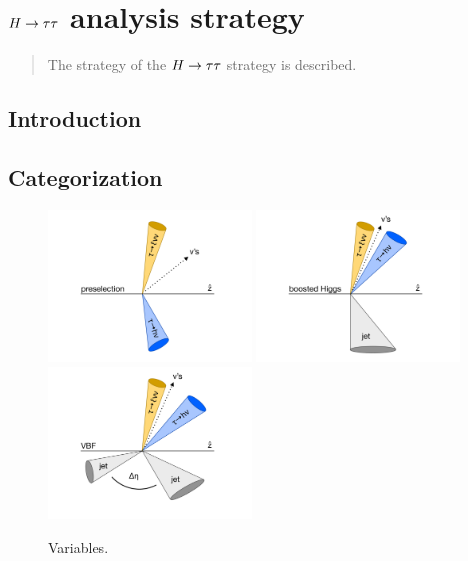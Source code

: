 \chapter[strategy][strategy]{$H\rightarrow\tau\tau$ analysis strategy}
\label{chap:strategy}

\begin{quote}
The strategy of the $H\rightarrow\tau\tau$ strategy is described.
\end{quote}

\section{Introduction}
\label{sec:strategy-introduction}

\section{Categorization}
\label{sec:strategy-categorization}

\begin{figure}[tp]
  \centering
  \includegraphics[width=0.48\textwidth]{figures/category-cartoons/presel}
  \includegraphics[width=0.48\textwidth]{figures/category-cartoons/boost}
  \includegraphics[width=0.48\textwidth]{figures/category-cartoons/vbf}
  \caption{Variables.}
  \label{fig:strategy-category-cartoons}
\end{figure}

